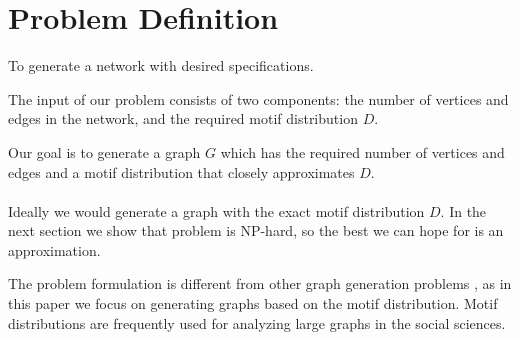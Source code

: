 \section{Problem Definition}
\label{sec:problem}
 To generate a network with desired specifications.

 The input of our problem consists of two components: the
number of vertices and edges in the network, and the required motif 
distribution $D$.

 Our goal is to generate a graph $G$ which has the required
number of vertices and edges and a motif distribution that closely
approximates $D$.
\\\\
Ideally we would generate a graph with the exact motif distribution $D$.
In the next section we show that problem is NP-hard, so the best we can 
hope for is an approximation.

The problem formulation is different from other graph generation problems
\cite{erdds1959random, watts1998collective, albert2002statistical,
newman2009random, molloy1995critical}, as in this paper we focus on
generating graphs based on the motif distribution.
Motif distributions are frequently used for analyzing large graphs in the
social sciences.



